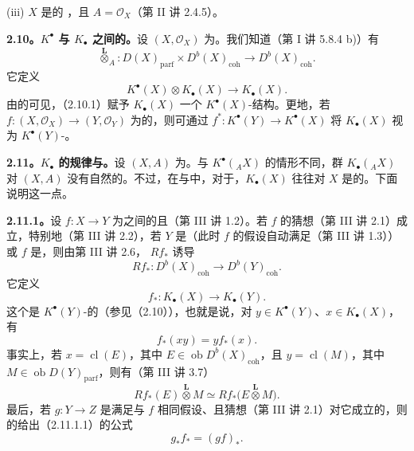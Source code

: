 (iii) $X$ 是的 ，且 $A=\mathscr O_X$（第 II 讲 2.4.5）。

\textbf{2.10。$K^\bullet$ 与 $K_\bullet$ 之间的。}设 $(X,\mathscr O_X)$ 为。我们知道（第 I 讲 5.8.4 b)）有
\[\mathbin{\overset{\mathbf L}{\otimes}}_A:D(X)_{\mathrm{parf}}\times D^b(X)_{\mathrm{coh}}\longrightarrow D^b(X)_{\mathrm{coh}}.\]
它定义
\[K^\bullet(X)\otimes K_\bullet(X)\longrightarrow K_\bullet(X).\tag{2.10.1}\]
由的可见，（2.10.1）赋予 $K_\bullet(X)$ 一个 $K^\bullet(X)$-结构。更地，若 $f:(X,\mathscr O_X)\to(Y,\mathscr O_Y)$ 为的，则可通过 $f^*:K^\bullet(Y)\to K^\bullet(X)$ 将 $K_\bullet(X)$ 视为 $K^\bullet(Y)$-。

\textbf{2.11。$K_\bullet$ 的规律与。}设 $(X,A)$ 为。与 $K^\bullet({}_AX)$ 的情形不同，群 $K_\bullet({}_AX)$ 对 $(X,A)$ 没有自然的。不过，在与中，对于，$K_\bullet(X)$ 往往对 $X$ 是的。下面说明这一点。

\textbf{2.11.1。}设 $f:X\to Y$ 为之间的且（第 III 讲 1.2）。若 $f$ 的猜想（第 III 讲 2.1）成立，特别地（第 III 讲 2.2），若 $Y$ 是（此时 $f$ 的假设自动满足（第 III 讲 1.3））或 $f$ 是，则由第 III 讲 2.6， $Rf_*$ 诱导
\[Rf_*:D^b(X)_{\mathrm{coh}}\longrightarrow D^b(Y)_{\mathrm{coh}}.\]
它定义
\[f_*:K_\bullet(X)\longrightarrow K_\bullet(Y).\tag{2.11.1.1}\]
这个是 $K^\bullet(Y)$-的（参见（2.10）），也就是说，对 $y\in K^\bullet(Y)$、$x\in K_\bullet(X)$，有
\[f_*(xy)=y f_*(x).\tag{2.11.1.2}\]
事实上，若 $x=\operatorname{cl}(E)$，其中 $E\in\operatorname{ob}D^b(X)_{\mathrm{coh}}$，且 $y=\operatorname{cl}(M)$，其中 $M\in\operatorname{ob}D(Y)_{\mathrm{parf}}$，则有（第 III 讲 3.7）
\[Rf_*(E)\mathbin{\overset{\mathbf L}{\otimes}}M\simeq Rf_*\bigl(E\mathbin{\overset{\mathbf L}{\otimes}}M\bigr).\]
最后，若 $g:Y\to Z$ 是满足与 $f$ 相同假设、且猜想（第 III 讲 2.1）对它成立的，则的给出（2.11.1.1）的公式
\[g_*f_*=(gf)_*.\tag{2.11.1.3}\]

